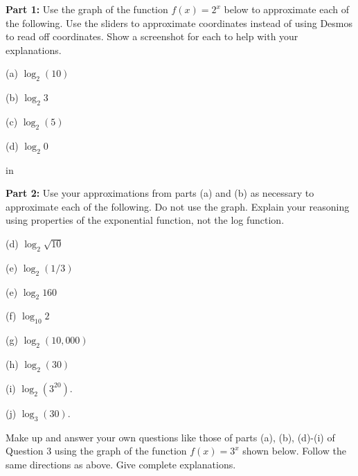 \documentclass{ximera}
\newcommand{\pskip}{\vskip 0.1 in}
\begin{document}
\begin{question}  \label{Ex1:LogF}

{\bf Part 1:} Use the graph of the function $f(x)=2^x$ below to approximate each of the following. Use the sliders to approximate coordinates instead of using Desmos to read off coordinates. Show a screenshot for each to help with your explanations.

(a) $\log_2 (10)$

(b) $\log_2 3$

(c) $\log_2 (5)$


(d) $\log_2 0$

\pskip

{\bf Part 2:} Use your approximations from parts (a) and (b) as necessary to approximate each of the following. Do not use the graph. Explain your reasoning using properties of the exponential function, not the log function.

(d) $\log_2 \sqrt{10}$

(e) $\log_2(1/3)$ 

(e)  $\log_2 160$ 

(f) $\log_{10} 2$ 

(g) $\log_2 (10,000)$

(h) $\log_2(30)$

(i) $\log_2(3^{20})$. 

(j) $\log_{3}(30)$.

\begin{exploration}
 
\begin{onlineOnly}
    \begin{center}
\end{center}
\end{onlineOnly}
\end{exploration}

\end{question}


\begin{question}  \label{Q111:LogF}
Make up and answer your own questions like those of parts (a), (b), (d)-(i) of Question 3 using the graph of the function $f(x)=3^x$ shown below. Follow the same directions as above. Give complete explanations.

\begin{exploration}
 
\begin{onlineOnly}
    \begin{center}
\end{center}
\end{onlineOnly}
\end{exploration}





\end{question}
\end{document}
